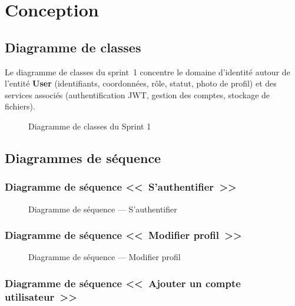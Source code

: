 \section{Conception}

\subsection{Diagramme de classes}

Le diagramme de classes du sprint~1 concentre le domaine d'identité autour
de l'entité \textbf{User} (identifiants, coordonnées, rôle, statut, photo de
profil) et des services associés (authentification JWT, gestion des comptes,
stockage de fichiers).

\begin{figure}[htbp]
  \centering
  \caption{Diagramme de classes du Sprint 1}
  \label{fig:class-sprint1}
\end{figure}


\subsection{Diagrammes de séquence}

\subsubsection{Diagramme de séquence <<~S'authentifier~>>}

\begin{figure}[htbp]
  \centering
  \caption{Diagramme de s\'equence --- S'authentifier}
  \label{fig:seq-login}
\end{figure}

\subsubsection{Diagramme de séquence <<~Modifier profil~>>}

\begin{figure}[htbp]
  \centering
  \caption{Diagramme de s\'equence --- Modifier profil}
  \label{fig:seq-profile}
\end{figure}

\subsubsection{Diagramme de séquence <<~Ajouter un compte utilisateur~>>}

